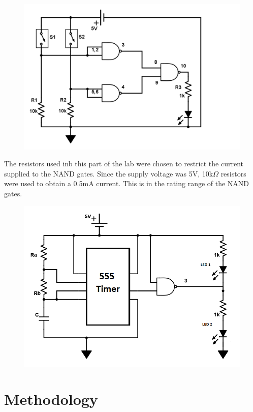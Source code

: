 \documentclass[twocolumn, amsmath]{revtex4}
\begin{document}
\begin{figure}[h]
    \includegraphics[scale=0.25]{NAND.png}  
    \caption{}
\end{figure}


The resistors used inb this part of the lab were chosen to restrict the current supplied to the NAND gates. Since the supply voltage was 5V, 10k$\Omega$ resistors were used to obtain a 0.5mA current. This is in the rating range of the NAND gates. %




\begin{figure}[h]
    \includegraphics[scale=0.35]{555.png}  
    \caption{}
\end{figure}

\section{Methodology}
\end{document}
